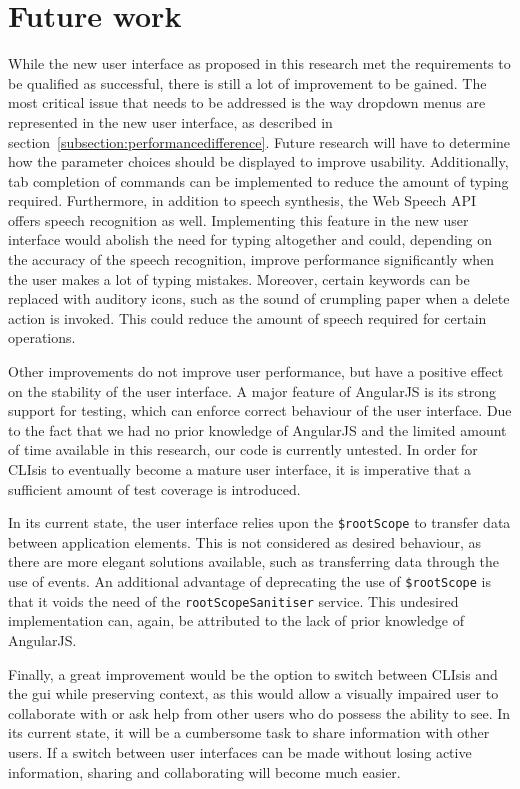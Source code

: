 \section{Future work}
\label{section:futurework}
While the new user interface as proposed in this research met the requirements to be qualified as successful, there is still a lot of improvement to be gained. The most critical issue that needs to be addressed is the way dropdown menus are represented in the new user interface, as described in section~\ref{subsection:performancedifference}. Future research will have to determine how the parameter choices should be displayed to improve usability. Additionally, tab completion of commands can be implemented to reduce the amount of typing required. Furthermore, in addition to speech synthesis, the Web Speech API offers speech recognition as well. Implementing this feature in the new user interface would abolish the need for typing altogether and could, depending on the accuracy of the speech recognition, improve performance significantly when the user makes a lot of typing mistakes. Moreover, certain keywords can be replaced with auditory icons, such as the sound of crumpling paper when a delete action is invoked. This could reduce the amount of speech required for certain operations.

Other improvements do not improve user performance, but have a positive effect on the stability of the user interface. A major feature of AngularJS is its strong support for testing, which can enforce correct behaviour of the user interface. Due to the fact that we had no prior knowledge of AngularJS and the limited amount of time available in this research, our code is currently untested. In order for CLIsis to eventually become a mature user interface, it is imperative that a sufficient amount of test coverage is introduced.

In its current state, the user interface relies upon the \texttt{\$rootScope} to transfer data between application elements. This is not considered as desired behaviour, as there are more elegant solutions available, such as transferring data through the use of events. An additional advantage of deprecating the use of \texttt{\$rootScope} is that it voids the need of the \texttt{rootScopeSanitiser} service. This undesired implementation can, again, be attributed to the lack of prior knowledge of AngularJS.

Finally, a great improvement would be the option to switch between CLIsis and the \acrshort{gui} while preserving context, as this would allow a visually impaired user to collaborate with or ask help from other users who do possess the ability to see. In its current state, it will be a cumbersome task to share information with other users. If a switch between user interfaces can be made without losing active information, sharing and collaborating will become much easier.

